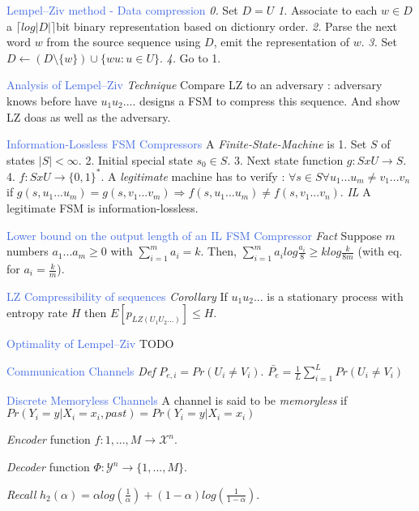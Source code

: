 \documentclass[10pt,a4paper,landscape]{article}
\newcommand{\concept}[1]{\textcolor{RoyalBlue}{#1}}
\newcommand{\subconcept}[1]{\textcolor{PineGreen}{\textit{#1}}}
\renewcommand{\section}[1]{
    \vspace{-0.3cm}
    \begin{center}
      \color{Bittersweet}
      \hrulefill{\small~~#1~~}\hrulefill
    \end{center}
    \vspace{-0.3cm}
  }
\begin{document}
\begin{multicols*}{4}
\concept{Lempel–Ziv method - Data compression}
\subconcept{0.} Set $D=U$
\subconcept{1.} Associate to each $w \in D$ a $\lceil log|D| \rceil$bit binary representation based on dictionry order.
\subconcept{2.} Parse the next word $w$ from the source sequence using $D$, emit the representation of $w$.
\subconcept{3.} Set $D \leftarrow (D\setminus \{w\})\cup \{wu:u \in U \}$.
\subconcept{4.} Go to 1.

\concept{Analysis of Lempel–Ziv} 
\subconcept{Technique} Compare LZ to an adversary : 
adversary knows before have $u_1u_2...$.
designs a FSM to compress this sequence.
And show LZ doas as well as the adversary.


\concept{Information-Lossless FSM Compressors}
A \subconcept{Finite-State-Machine} is 1. Set $S$ of states $|S|<\infty$.
2. Initial special state $s_0 \in S$.
3. Next state function $g:SxU \to S$.
4. $f:SxU \to \{ 0,1 \}^*$.
A \subconcept{legitimate} machine has to verify :
$\forall s \in S \forall u_1...u_m \neq v_1...v_n$ if $g(s,u_1...u_m)=g(s,v_1...v_m) \Rightarrow f(s,u_1...u_m) \neq f(s,v_1...v_n)$.
\subconcept{IL} A legitimate FSM is information-lossless.

\concept{Lower bound on the output length of an IL FSM Compressor} 
\subconcept{Fact} Suppose $m$ numbers $a_1...a_m \ge 0$ with $\sum_{i=1}^m a_i=k$.
Then, $\sum_{i=1}^m a_i log \frac{a_i}{8} \ge k log \frac{k}{8m}$ (with eq. for $a_i=\frac{k}{m}$).

\concept{LZ Compressibility of sequences} 
\subconcept{Corollary} If $u_1u_2...$ is a stationary process with entropy rate $H$ then $E[p_{LZ(U_1U_2...)}] \le H$.

\concept{Optimality of Lempel–Ziv} TODO

\section{Channels}

\concept{Communication Channels} 
\subconcept{Def}
$P_{e,i}=Pr(U_i \neq V_i)$. 
$\bar{P_e}=\frac{1}{L} \sum_{i=1}^L Pr(U_i \neq V_i)$

\concept{Discrete Memoryless Channels} 
A channel is said to be \subconcept{memoryless} if $Pr(Y_i=y|X_i=x_i,past)=Pr(Y_i=y|X_i=x_i)$

\subconcept{Encoder} function $f:{1,...,M} \to \mathcal{X}^n$.

\subconcept{Decoder} function $\Phi:\mathcal{Y}^n \to \{1,...,M\}$.

\subconcept{Recall} $h_2(\alpha)=\alpha log( \frac{1}{\alpha})+(1-\alpha) log (\frac{1}{1-\alpha})$.


\end{multicols*}
\end{document}
